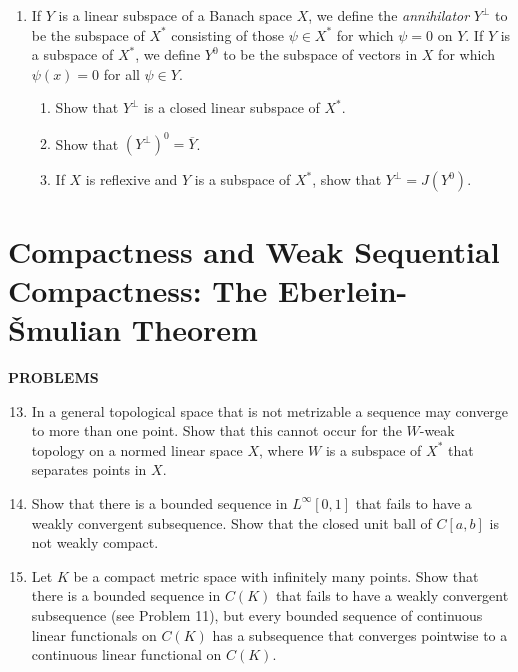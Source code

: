 \begin{enumerate}
    \item If $Y$ is a linear subspace of a Banach space $X$, we define the \textit{annihilator} $Y^\perp$ to be the subspace of $X^*$ consisting of those $\psi\in X^*$ for which $\psi=0$ on $Y$.
    If $Y$ is a subspace of $X^*$, we define $Y^0$ to be the subspace of vectors in $X$ for which $\psi(x)=0$ for all $\psi\in Y$.
    \begin{enumerate}[label=(\roman*),align=left]
        \item Show that $Y^\perp$ is a closed linear subspace of $X^*$.
        \item Show that $(Y^\perp)^0=\overline Y$.
        \item If $X$ is reflexive and $Y$ is a subspace of $X^*$, show that $Y^\perp=J(Y^0)$.
    \end{enumerate}
\end{enumerate}

\section{Compactness and Weak Sequential Compactness: The Eberlein-\v Smulian Theorem}
\begin{center}
	\textbf{PROBLEMS}
\end{center}
\begin{enumerate}
	\setcounter{enumi}{12}
    \item In a general topological space that is not metrizable a sequence may converge to more than one point. Show that this cannot occur for the $W$-weak topology on a normed linear space $X$, where $W$ is a subspace of $X^*$ that separates points in $X$.
    \item Show that there is a bounded sequence in $L^\infty[0,1]$ that fails to have a weakly convergent subsequence. Show that the closed unit ball of $C[a,b]$ is not weakly compact.
    \item Let $K$ be a compact metric space with infinitely many points. Show that there is a bounded sequence in $C(K)$ that fails to have a weakly convergent subsequence (see Problem 11), but every bounded sequence of continuous linear functionals on $C(K)$ has a subsequence that converges pointwise to a continuous linear functional on $C(K)$.
\end{enumerate}

